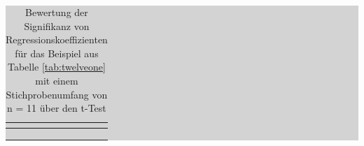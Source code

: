 \clearpage

\begin{table}[H]
\setlength{\arrayrulewidth}{.1em}
\caption{Bewertung der Signifikanz von Regressionskoeffizienten f\"{u}r das Beispiel aus Tabelle \ref{tab:twelveone} mit einem Stichprobenumfang von n = 11 \"{u}ber den t-Test}
\setlength{\fboxsep}{0pt}%
\colorbox{lightgray}{%
%
\begin{tabular}{| c | c | c | c | c | c |}
\hline
\parbox[c][0.65in][c]{0.95in}{\smallskip\centering\textbf{\selectfont{Name}}} & 
\parbox[c][0.65in][c]{0.95in}{\smallskip\centering\textbf{}} & 
\parbox[c][0.65in][c]{0.95in}{\smallskip\centering\textbf{}} & 
\parbox[c][0.65in][c]{0.95in}{\smallskip\centering\textbf{\selectfont{t-Wert}}} & 
\parbox[c][0.65in][c]{0.95in}{\smallskip\centering\textbf{\selectfont{p-Wert}}} & 
\parbox[c][0.65in][c]{0.95in}{\smallskip\centering\textbf{\selectfont{Signifikanz}}}\\ \hline

\parbox[c][0.3in][c]{0.95in}{} &
\parbox[c][0.3in][c]{0.95in}{} &
\parbox[c][0.3in][c]{0.95in}{} &
\parbox[c][0.3in][c]{0.95in}{} &
\parbox[c][0.3in][c]{0.95in}{} &
\parbox[c][0.3in][c]{0.95in}{}\\ \hline

\parbox[c][0.3in][c]{0.95in}{} &
\parbox[c][0.3in][c]{0.95in}{} &
\parbox[c][0.3in][c]{0.95in}{} &
\parbox[c][0.3in][c]{0.95in}{} &
\parbox[c][0.3in][c]{0.95in}{} &
\parbox[c][0.3in][c]{0.95in}{}\\ \hline

\parbox[c][0.3in][c]{0.95in}{} &
\parbox[c][0.3in][c]{0.95in}{} &
\parbox[c][0.3in][c]{0.95in}{} &
\parbox[c][0.3in][c]{0.95in}{} &
\parbox[c][0.3in][c]{0.95in}{} &
\parbox[c][0.3in][c]{0.95in}{}\\ \hline


\end{tabular}}
\end{table}
